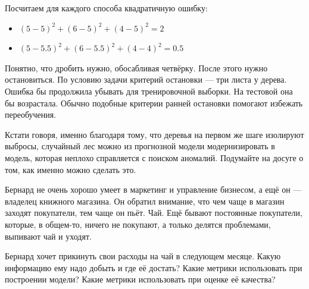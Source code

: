 \documentclass[12pt, a4paper, oneside]{article}
\theoremstyle{plain} %
\theoremstyle{definition}
\newcounter{problem}%
\renewcommand{\theproblem}{\arabic{problem}}
\newenvironment{problem}[1]{
\addtocounter{problem}{1}\noindent{ \color{titleblue} \large \bfseries Упражнение~\theproblem~#1 \vspace{1ex} \newline}
}{ }
\begin{document}
\begin{solution}
Посчитаем для каждого способа квадратичную ошибку: 

\begin{itemize}
	\item  $ (5 - 5)^2 + (6 - 5)^2 + (4 - 5)^2 = 2$
	\item  $ (5 - 5.5)^2 + (6 - 5.5)^2 + (4 - 4)^2  = 0.5$
\end{itemize}
	
Понятно, что дробить нужно, обосабливая четвёрку. После этого нужно остановиться. По условию задачи критерий остановки --- три листа у дерева. Ошибка бы продолжила убывать для тренировочной выборки. На тестовой она бы возрастала. Обычно подобные критерии ранней остановки помогают избежать переобучения.
	
Кстати говоря, именно благодаря тому, что деревья на первом же шаге изолируют выбросы, случайный лес можно из прогнозной модели модернизировать в модель, которая неплохо справляется с поиском аномалий. Подумайте на досуге о том, как именно можно сделать это. 
\end{solution}


\begin{problem}{ }
 Бернард не очень хорошо умеет в маркетинг и управление бизнесом, а ещё он --- владелец книжного магазина. Он обратил внимание, что чем чаще в магазин заходят покупатели, тем чаще он пьёт. Чай. Ещё бывают постоянные покупатели, которые, в общем-то, ничего не покупают, а только делятся проблемами, выпивают чай и уходят.

Бернард хочет прикинуть свои расходы на чай в следующем месяце. Какую информацию ему надо добыть и где её достать? Какие метрики использовать при построении модели? Какие метрики использовать при оценке её качества? 
\end{problem}
\end{document}

